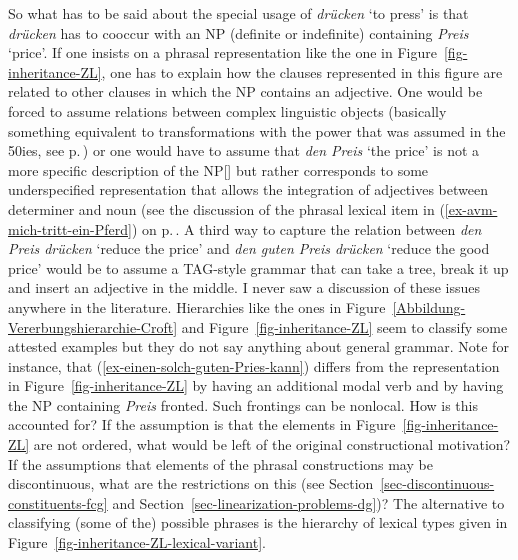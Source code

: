 \begin{exe}
\begin{xlist}[iv.]
\begin{exe}
\begin{xlist}[iv.]
So what has to be said about the special usage of \emph{drücken} `to press' is that \emph{drücken} has to
cooccur with an NP (definite or indefinite) containing \emph{Preis} `price'. If one insists on a phrasal
representation like the one in Figure~\ref{fig-inheritance-ZL}, one has to explain how the clauses
represented in this figure are related to other clauses in which the NP contains an adjective. One
would be forced to assume relations between complex linguistic objects (basically something
equivalent to transformations with the power that was assumed in the 50ies, see p.\,\pageref{page-TG-Typ0}) or one would have to
assume that \emph{den Preis} `the price' is not a more specific description of the NP[] but rather
corresponds to some underspecified representation that allows the integration of adjectives between
determiner and noun (see the discussion of the phrasal lexical item in
(\ref{ex-avm-mich-tritt-ein-Pferd}) on p.\,\pageref{ex-avm-mich-tritt-ein-Pferd}. A third way to
capture the relation between \emph{den Preis drücken} `reduce the price' and \emph{den guten Preis
  drücken} `reduce the good price' would be to assume a TAG-style grammar that can take a tree, break it up and insert an adjective in the
middle. I never saw a discussion of these issues anywhere in the literature. Hierarchies like the
ones in Figure~\ref{Abbildung-Vererbungshierarchie-Croft} and Figure~\ref{fig-inheritance-ZL} seem
to classify some attested examples but they do not say anything about general grammar. Note for
instance, that (\ref{ex-einen-solch-guten-Pries-kann}) differs from the representation in
Figure~\ref{fig-inheritance-ZL} by having an additional modal verb and by having the NP containing
\emph{Preis} fronted. Such frontings can be nonlocal. How is this accounted for? If the assumption
is that the elements in Figure~\ref{fig-inheritance-ZL} are not ordered, what would be left of the
original constructional motivation? If the assumptions that elements of the phrasal constructions
may be discontinuous, what are the restrictions on this (see
Section~\ref{sec-discontinuous-constituents-fcg} and Section~\ref{sec-linearization-problems-dg})?
The alternative to classifying (some of the) possible phrases is the hierarchy of lexical types given
in Figure~\vref{fig-inheritance-ZL-lexical-variant}.
\begin{figure}
\end{figure}
\end{xlist}
\end{exe}
\end{xlist}
\end{exe}
